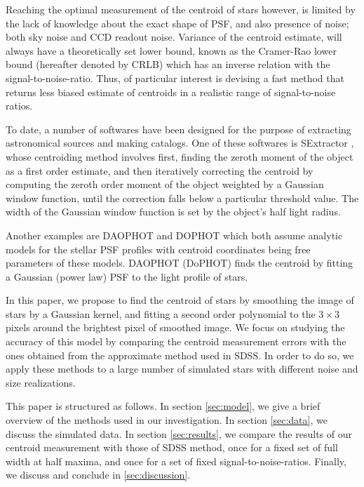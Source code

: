 \documentclass[12pt, preprint]{aastex}
\begin{document}
Reaching the optimal measurement of the centroid of stars however, is limited by the lack of knowledge about the exact shape of PSF, and also presence of noise; both sky noise and CCD readout noise. Variance of the centroid estimate, will always have a theoretically set lower bound, known as the Cramer-Rao lower bound (hereafter denoted by CRLB) which has an inverse relation with the signal-to-noise-ratio. Thus, of particular interest is devising a fast method that returns less biased estimate of centroids in a realistic range of signal-to-noise ratios.       

To date, a number of softwares have been designed for the purpose of extracting astronomical sources and making catalogs. One of these softwares is SExtractor \citep{sex}, whose centroiding method involves first, finding the zeroth moment of the object as a first order estimate, and then iteratively correcting the centroid by computing the zeroth order moment of the object weighted by a Gaussian window function, until the correction falls below a particular threshold value. The width of the Gaussian window function is set by the object's half light radius.

Another examples are DAOPHOT \citep{daophot} and DOPHOT \citep{dophot} which both assume analytic models for the stellar PSF profiles with centroid coordinates being free parameters of these models. DAOPHOT (DoPHOT) finds the centroid by fitting a Gaussian (power law) PSF to the light profile of stars.

In this paper, we propose to find the centroid of stars by smoothing the image of stars by a Gaussian kernel, and fitting a second order polynomial to the $3\times3$ pixels around the brightest pixel of smoothed image. We focus on studying the accuracy of this model by comparing the centroid measurement errors with the ones obtained from the approximate method used in SDSS. In order to do so, we apply these methods to a large number of simulated stars with different noise and size realizations.

This paper is structured as follows. In section \ref{sec:model}, we give a brief overview of the methods used in our investigation. In section \ref{sec:data}, we discuss the simulated data. In section \ref{sec:results}, we compare the results of our centroid measurement with those of SDSS method, once for a fixed set of full width at half maxima, and once for a set of fixed signal-to-noise-ratios. Finally, we discuss and conclude in \ref{sec:discussion}.               
\end{document}
